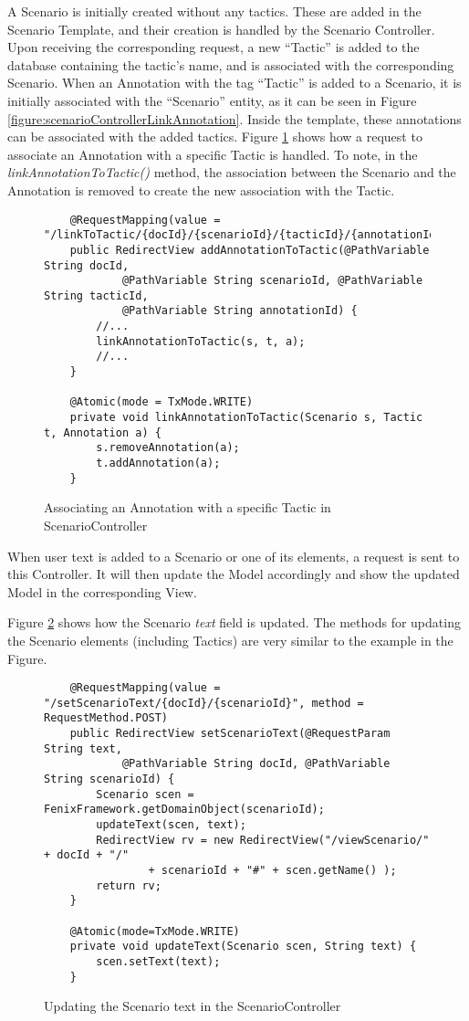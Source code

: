 A Scenario is initially created without any tactics. These are added in the Scenario Template, and their creation is handled by the Scenario Controller. Upon receiving the corresponding request, a new ``Tactic'' is added to the database containing the tactic's name, and is associated with the corresponding Scenario. When an Annotation with the tag ``Tactic'' is added to a Scenario, it is initially associated with the ``Scenario'' entity, as it can be seen in Figure \ref{figure:scenarioControllerLinkAnnotation}. Inside the template, these annotations can be associated with the added tactics. Figure \ref{figure:scenarioControllerLinkToTactic} shows how a request to associate an Annotation with a specific Tactic is handled. To note, in the \textit{linkAnnotationToTactic()} method, the association between the Scenario and the Annotation is removed to create the new association with the Tactic.

\begin{figure}[h]
\lstset{style=customjava}
\begin{lstlisting}
	@RequestMapping(value = "/linkToTactic/{docId}/{scenarioId}/{tacticId}/{annotationId}")
	public RedirectView addAnnotationToTactic(@PathVariable String docId,
			@PathVariable String scenarioId, @PathVariable String tacticId,
			@PathVariable String annotationId) {
		//...
		linkAnnotationToTactic(s, t, a);
		//...
	}
	
	@Atomic(mode = TxMode.WRITE)
	private void linkAnnotationToTactic(Scenario s, Tactic t, Annotation a) {
		s.removeAnnotation(a);
		t.addAnnotation(a);
	}
\end{lstlisting}
\caption{Associating an Annotation with a specific Tactic in ScenarioController}
\label{figure:scenarioControllerLinkToTactic}
\end{figure}

When user text is added to a Scenario or one of its elements, a request is sent to this Controller. It will then update the Model accordingly and show the updated Model in the corresponding View.

Figure \ref{figure:scenarioControllerText} shows how the Scenario \textit{text} field is updated. The methods for updating the Scenario elements (including Tactics) are very similar to the example in the Figure.

\begin{figure}[h]
\lstset{style=customjava}
\begin{lstlisting}
	@RequestMapping(value = "/setScenarioText/{docId}/{scenarioId}", method = RequestMethod.POST)
	public RedirectView setScenarioText(@RequestParam String text,
			@PathVariable String docId, @PathVariable String scenarioId) {
		Scenario scen = FenixFramework.getDomainObject(scenarioId);
		updateText(scen, text);
		RedirectView rv = new RedirectView("/viewScenario/" + docId + "/"
				+ scenarioId + "#" + scen.getName() );
		return rv;
	}
	
	@Atomic(mode=TxMode.WRITE)
	private void updateText(Scenario scen, String text) {
		scen.setText(text);
	}	
\end{lstlisting}
\caption{Updating the Scenario text in the ScenarioController}
\label{figure:scenarioControllerText}
\end{figure}

